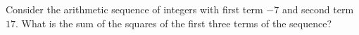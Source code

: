 Consider the arithmetic sequence of integers with first term $-7$ and second term $17$. What is the sum of the squares of the first three terms of the sequence?